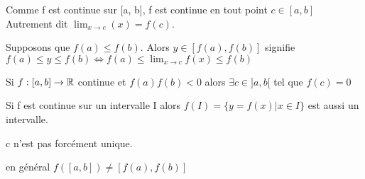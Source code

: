 \documentclass[a4paper, 12pt]{article}
\begin{document}
\begin{demonstration}
    Comme f est continue sur [a, b], f est continue en tout point $c \in [a, b]$
    Autrement dit $\lim_{x \to c}(x) = f(c)$.

    Supposons que $f(a) \leq f(b)$. Alors $y \in [f(a), f(b)]$ signifie $f(a) \leq y \leq f(b) \iff f(a) \leq \lim_{x \to c}f(x) \leq f(b)$
\end{demonstration}

\begin{corollaire}
    Si $f: [a, b] \rightarrow \mathbb{R}$ continue et $f(a)f(b) \lt 0$ alors $\exists c \in ]a, b[$ tel que $f(c) = 0$
\end{corollaire}

\begin{corollaire}
    Si f est continue sur un intervalle I alors $f(I) = \{y = f(x) | x \in I\}$ est aussi un intervalle.
\end{corollaire}

\begin{remark}
    \item c n'est pas forcément unique.
    \item en général $f([a, b]) \neq [f(a), f(b)]$
\end{remark}
\end{document}
